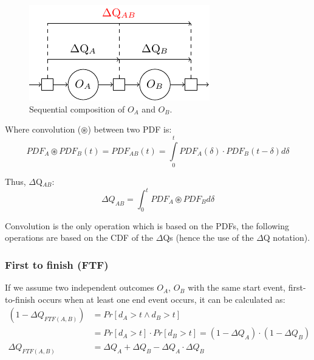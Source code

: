         \begin{figure}[H]
            \begin{center}
                \includegraphics[scale=1]{tikz/seq_comp.pdf}
            \end{center}
            \caption{Sequential composition of $O_A$ and $O_B$.}
        \end{figure}
        Where convolution ($\circledast$) between two PDF is:
        \begin{equation}
            PDF_A \circledast PDF_B (t) = PDF_{AB}(t) =\int\limits_0^t PDF_A(\delta) \cdot PDF_B(t-\delta)d\delta 
            \label{eq:conv_1}
        \end{equation}

        Thus, $\Delta$Q$_{AB}$:
        \begin{equation}
            \Delta Q_{AB} = \int_0^t PDF_{A} \circledast PDF_{B} d\delta
            \label{eq:convolution_pdf}
        \end{equation}

        Convolution is the only operation which is based on the PDFs, the following operations are based on the CDF of the $\Delta$Qs (hence the use of the $\Delta$Q notation).
        
    \subsubsection{First to finish (FTF)}
            If we assume two independent outcomes $O_A$, $O_B$ with the same start event, first-to-finish occurs when at least one end event occurs, it can be calculated as:
        \begin{equation}
            \begin{split}
                (1 - \Delta Q_{FTF(A, B)}) &= Pr[d_A > t \wedge d_B > t] \\
                & = Pr[d_A > t] \cdot Pr[d_B > t] = (1 - \Delta Q_A) \cdot (1 - \Delta Q_B) \\
                \Delta Q_{FTF(A, B)} &= \Delta Q_A + \Delta Q_B - \Delta Q_A \cdot \Delta Q_B  
            \end{split}    
            \label{eq:ftf} 
        \end{equation}

